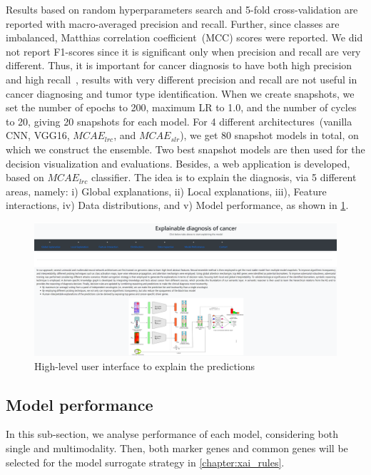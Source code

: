 \hspace*{3.5mm} Results based on random hyperparameters search and 5-fold cross-validation are reported with macro-averaged precision and recall. Further, since classes are imbalanced, Matthias correlation coefficient~(MCC) scores were reported. We did not report F1-scores since it is significant only when precision and recall are very different. Thus, it is important for cancer diagnosis to have both high precision and high recall~\cite{naulaerts2017precision}, results with very different precision and recall are not useful in cancer diagnosing and tumor type identification. 
When we create snapshots, we set the number of epochs to 200, maximum LR to 1.0, and the number of cycles to 20, giving 20 snapshots for each model. For 4 different architectures~(vanilla CNN, VGG16, $MCAE_{lrc}$, and $MCAE_{slr}$), we get 80 snapshot models in total, on which we construct the ensemble. Two best snapshot models are then used for the decision visualization and evaluations. Besides, a web application is developed, based on $MCAE_{lrc}$ classifier. The idea is to explain the diagnosis, via 5 different areas, namely: i) Global explanations, ii) Local explanations, iii), Feature interactions, iv) Data distributions, and v) Model performance, as shown in \cref{fig:ui_explain}. 

\begin{figure}
\centering
	\includegraphics[scale=0.55]{images/ui.png}
	\caption{High-level user interface to explain the predictions}
    \label{fig:ui_explain}
    \vspace{-4mm}
\end{figure}

\subsection{Model performance}
In this sub-section, we analyse performance of each model, considering both single and multimodality. Then, both marker genes and common genes will be selected for the model surrogate strategy in \cref{chapter:xai_rules}.

